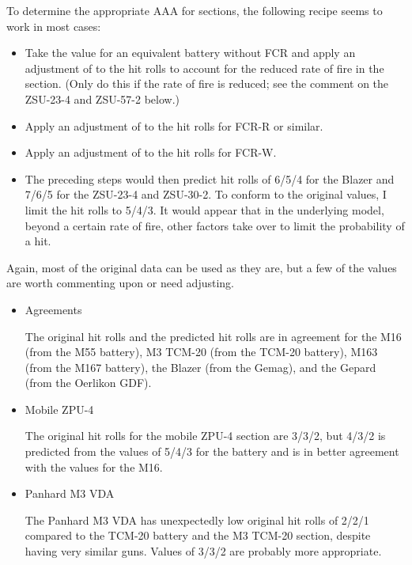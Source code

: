 {    To determine the appropriate AAA for sections, the following recipe seems to work in most cases:
    \begin{itemize}
        \item Take the value for an equivalent battery without FCR and apply an adjustment of  to the hit rolls to account for the reduced rate of fire in the section. (Only do this if the rate of fire is reduced; see the comment on the ZSU-23-4 and ZSU-57-2 below.)
        \item Apply an adjustment of  to the hit rolls for FCR-R or similar.
        \item Apply an adjustment of  to the hit rolls for FCR-W.
        \item The preceding steps would then predict hit rolls of 6/5/4 for the Blazer and 7/6/5 for the ZSU-23-4 and ZSU-30-2. To conform to the original values, I limit the hit rolls to 5/4/3. It would appear that in the underlying model, beyond a certain rate of fire, other factors take over to limit the probability of a hit.
    \end{itemize}


    Again, most of the original data can be used as they are, but a few of the values are worth commenting upon or need adjusting.
    \begin{itemize}
        \item Agreements

            The original hit rolls and the predicted hit rolls are in agreement for the M16 (from the M55 battery), M3 TCM-20 (from the TCM-20 battery), M163 (from the M167 battery), the Blazer (from the Gemag), and the Gepard (from the Oerlikon GDF).

        \item Mobile ZPU-4

            The original hit rolls for the mobile ZPU-4 section are 3/3/2, but 4/3/2 is predicted from the values of 5/4/3 for the battery and is in better agreement with the values for the M16.

        \item Panhard M3 VDA

            The Panhard M3 VDA has unexpectedly low original hit rolls of 2/2/1 compared to the TCM-20 battery and the M3 TCM-20 section, despite having very similar guns. Values of 3/3/2 are probably more appropriate.


\end{itemize}}

